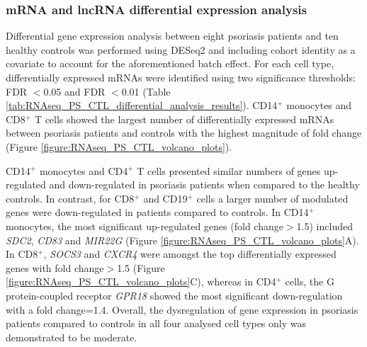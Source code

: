 \subsubsection{mRNA and lncRNA differential expression analysis}

Differential gene expression analysis between eight psoriasis patients and ten healthy controls was performed using DESeq2 and including cohort identity as a covariate to account for the aforementioned batch effect. For each cell type, differentially expressed mRNAs were identified using two significance thresholds: FDR $<$0.05 and FDR $<$0.01 (Table \ref{tab:RNAseq_PS_CTL_differential_analysis_results}). CD14$^+$ monocytes and CD8$^+$ T cells showed the largest number of differentially expressed mRNAs between psoriasis patients and controls with the highest magnitude of fold change (Figure \ref{figure:RNAseq_PS_CTL_volcano_plots}). %

CD14$^+$ monocytes and CD4$^+$ T cells presented similar numbers of genes up-regulated and down-regulated in psoriasis patients when compared to the healthy controls. In contrast, for CD8$^+$ and CD19$^+$ cells a larger number of modulated genes were down-regulated in patients compared to controls. In CD14$^+$ monocytes, the most significant up-regulated genes (fold change$>$1.5) included \textit{SDC2}, \textit{CD83} and \textit{MIR22G} (Figure \ref{figure:RNAseq_PS_CTL_volcano_plots}A). In CD8$^+$, \textit{SOCS3} and \textit{CXCR4}  were amongst the top differentially expressed genes with fold change$>$1.5 (Figure \ref{figure:RNAseq_PS_CTL_volcano_plots}C), whereas  in CD4$^+$ cells, the G protein-coupled receptor \textit{GPR18} showed the most significant down-regulation with a fold change=1.4.  Overall, the dysregulation of gene expression in psoriasis patients compared to controls in all four analysed cell types only was demonstrated to be moderate. 

